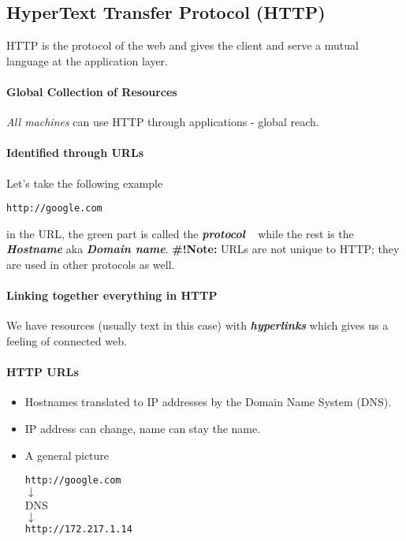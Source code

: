 \documentclass[10pt]{article}
\begin{document}
\subsection{HyperText Transfer Protocol (HTTP)}
HTTP is the protocol of the web and gives the client and serve a mutual language at the application layer. 
\paragraph{Global Collection of Resources} \textit{All machines} can use HTTP through applications - global reach.

\paragraph{Identified through URLs} Let's take the following example
\begin{center}
    \texttt{\color{Green}http://\color{Black}google.com}
\end{center}
in the URL, \color{Green}the green part is called the \textit{\textbf{protocol}} ~\color{Black} while the rest is the \textit{\textbf{Hostname}} aka \textit{\textbf{Domain name}}. \textbf{\#!Note:} URLs are not unique to HTTP; they are used in other protocols as well. 

\paragraph{Linking together everything in HTTP} We have resources (usually text in this case) with \textit{\textbf{hyperlinks}} which gives us a feeling of connected web. 

\paragraph{HTTP URLs}
\begin{itemize}
    \item Hostnames translated to IP addresses by the Domain Name System (DNS).
    \item IP address can change, name can stay the name.
    \item A general picture
    \begin{mdframed}
        \begin{center}
            \texttt{http://google.com} \\
            $\downarrow$\\ 
            DNS\\
            $\downarrow$\\
            \texttt{http://172.217.1.14}
        \end{center}
    \end{mdframed}
\end{itemize}
\end{document}
